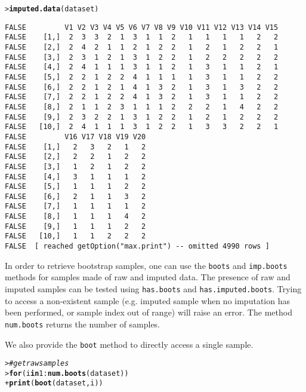 \documentclass{article}\usepackage[]{graphicx}\usepackage[]{color}
\makeatletter
\newcommand{\hlnum}[1]{\textcolor[rgb]{0.686,0.059,0.569}{#1}}%
\newcommand{\hlcom}[1]{\textcolor[rgb]{0.678,0.584,0.686}{\textit{#1}}}%
\newcommand{\hlopt}[1]{\textcolor[rgb]{0,0,0}{#1}}%
\newcommand{\hlstd}[1]{\textcolor[rgb]{0.345,0.345,0.345}{#1}}%
\newcommand{\hlkwa}[1]{\textcolor[rgb]{0.161,0.373,0.58}{\textbf{#1}}}%
\newcommand{\hlkwd}[1]{\textcolor[rgb]{0.737,0.353,0.396}{\textbf{#1}}}%
\newenvironment{kframe}{%
 \def\at@end@of@kframe{}%
 \ifinner\ifhmode%
  \def\at@end@of@kframe{\end{minipage}}%
  \begin{minipage}{\columnwidth}%
 \fi\fi%
 \def\FrameCommand##1{\hskip\@totalleftmargin \hskip-\fboxsep
 \colorbox{shadecolor}{##1}\hskip-\fboxsep
     \hskip-\linewidth \hskip-\@totalleftmargin \hskip\columnwidth}%
 \MakeFramed {\advance\hsize-\width
   \@totalleftmargin\z@ \linewidth\hsize
   \@setminipage}}%
 {\par\unskip\endMakeFramed%
 \at@end@of@kframe}
\newenvironment{knitrout}{}{} %
\newcommand{\Rmethod}[1]{{\texttt{#1}}}
\makeatother
\begin{document}
\begin{knitrout}
\begin{kframe}
{\ttfamily\noindent\itshape\color{messagecolor}{FALSE bnstruct :: performing imputation ...\\FALSE bnstruct :: imputation finished.}}\begin{alltt}
\hlstd{> }\hlkwd{imputed.data}\hlstd{(dataset)}
\end{alltt}
\begin{verbatim}
FALSE         V1 V2 V3 V4 V5 V6 V7 V8 V9 V10 V11 V12 V13 V14 V15
FALSE    [1,]  2  3  3  2  1  3  1  1  2   1   1   1   1   2   2
FALSE    [2,]  2  4  2  1  1  2  1  2  2   1   2   1   2   2   1
FALSE    [3,]  2  3  1  2  1  3  1  2  2   1   2   2   2   2   2
FALSE    [4,]  2  4  1  1  1  3  1  1  2   1   3   1   1   2   1
FALSE    [5,]  2  2  1  2  2  4  1  1  1   1   3   1   1   2   2
FALSE    [6,]  2  2  1  2  1  4  1  3  2   1   3   1   3   2   2
FALSE    [7,]  2  2  1  2  2  4  1  3  2   1   3   1   1   2   2
FALSE    [8,]  2  1  1  2  3  1  1  1  2   2   2   1   4   2   2
FALSE    [9,]  2  3  2  2  1  3  1  2  2   1   2   1   2   2   2
FALSE   [10,]  2  4  1  1  1  3  1  2  2   1   3   3   2   2   1
FALSE         V16 V17 V18 V19 V20
FALSE    [1,]   2   3   2   1   2
FALSE    [2,]   2   2   1   2   2
FALSE    [3,]   1   2   1   2   2
FALSE    [4,]   3   1   1   1   2
FALSE    [5,]   1   1   1   2   2
FALSE    [6,]   2   1   1   3   2
FALSE    [7,]   1   1   1   1   2
FALSE    [8,]   1   1   1   4   2
FALSE    [9,]   1   1   1   2   2
FALSE   [10,]   1   1   2   2   2
FALSE  [ reached getOption("max.print") -- omitted 4990 rows ]
\end{verbatim}
\end{kframe}
\end{knitrout}

In order to retrieve bootstrap samples, one can use the \Rmethod{boots} and \Rmethod{imp.boots} methods for samples
made of raw and imputed data. The presence of raw and imputed samples can be tested using \Rmethod{has.boots} and \Rmethod{has.imputed.boots}.
Trying to access a non-existent sample (e.g. imputed sample when no imputation has been performed,
or sample index out of range) will raise an error. The method \Rmethod{num.boots} returns the number of samples.

We also provide the \Rmethod{boot} method to directly access a single sample.

\begin{knitrout}
\color{fgcolor}\begin{kframe}
\begin{alltt}
\hlstd{> }\hlcom{# get raw samples}
\hlstd{> }\hlkwa{for} \hlstd{(i} \hlkwa{in} \hlnum{1}\hlopt{:}\hlkwd{num.boots}\hlstd{(dataset))}
\hlstd{+ }  \hlkwd{print}\hlstd{(} \hlkwd{boot}\hlstd{(dataset, i) )}
\end{alltt}
\end{kframe}
\end{knitrout}
\end{document}
